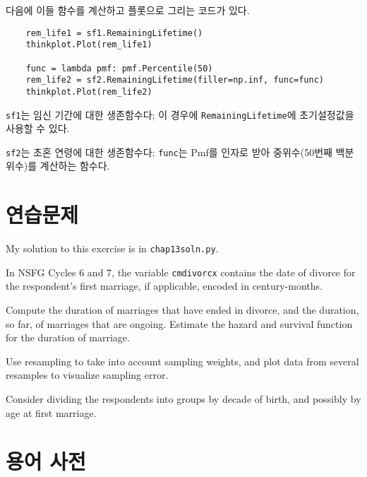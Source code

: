 다음에 이들 함수를 계산하고 플롯으로 그리는 코드가 있다.

\begin{verbatim}
    rem_life1 = sf1.RemainingLifetime()
    thinkplot.Plot(rem_life1)

    func = lambda pmf: pmf.Percentile(50)
    rem_life2 = sf2.RemainingLifetime(filler=np.inf, func=func)
    thinkplot.Plot(rem_life2)
\end{verbatim}

{\tt sf1}는 임신 기간에 대한 생존함수다;
이 경우에 {\tt RemainingLifetime}에 초기설정값을 사용할 수 있다.

{\tt sf2}는 초혼 연령에 대한 생존함수다;
{\tt func}는 Pmf를 인자로 받아 중위수(50번째 백분위수)를 계산하는 함수다.


\section{연습문제}

My solution to this exercise is in \verb"chap13soln.py".

\begin{exercise}
In NSFG Cycles 6 and 7, the variable {\tt cmdivorcx} contains the
date of divorce for the respondent's first marriage, if applicable,
encoded in century-months.

Compute the duration of marriages that have ended in divorce, and
the duration, so far, of marriages that are ongoing.  Estimate the
hazard and survival function for the duration of marriage.

Use resampling to take into account sampling weights, and plot
data from several resamples to visualize sampling error.

Consider dividing the respondents into groups by decade of birth,
and possibly by age at first marriage.

\end{exercise}


\section{용어 사전}

